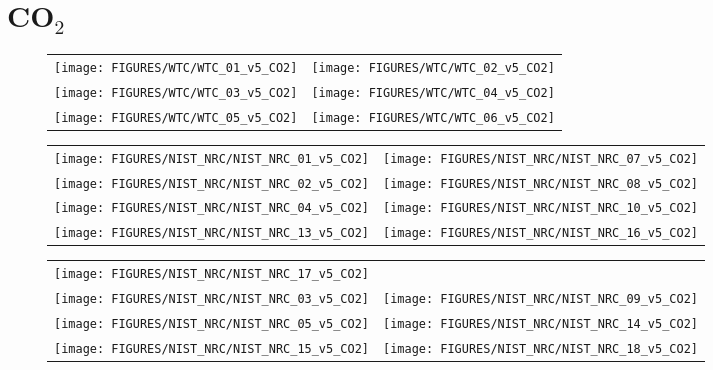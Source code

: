 \clearpage




\section{CO$_2$}

\begin{figure}[h]
\begin{tabular*}{\textwidth}{l@{\extracolsep{\fill}}r}
\texttt{[image: FIGURES/WTC/WTC\_01\_v5\_CO2]} &
\texttt{[image: FIGURES/WTC/WTC\_02\_v5\_CO2]} \\
\texttt{[image: FIGURES/WTC/WTC\_03\_v5\_CO2]} &
\texttt{[image: FIGURES/WTC/WTC\_04\_v5\_CO2]} \\
\texttt{[image: FIGURES/WTC/WTC\_05\_v5\_CO2]} &
\texttt{[image: FIGURES/WTC/WTC\_06\_v5\_CO2]}
\end{tabular*}
\label{NIST_WTC_CO2}
\end{figure}

\begin{figure}[p]
\begin{tabular*}{\textwidth}{l@{\extracolsep{\fill}}r}
\texttt{[image: FIGURES/NIST\_NRC/NIST\_NRC\_01\_v5\_CO2]} &
\texttt{[image: FIGURES/NIST\_NRC/NIST\_NRC\_07\_v5\_CO2]} \\
\texttt{[image: FIGURES/NIST\_NRC/NIST\_NRC\_02\_v5\_CO2]} &
\texttt{[image: FIGURES/NIST\_NRC/NIST\_NRC\_08\_v5\_CO2]} \\
\texttt{[image: FIGURES/NIST\_NRC/NIST\_NRC\_04\_v5\_CO2]} &
\texttt{[image: FIGURES/NIST\_NRC/NIST\_NRC\_10\_v5\_CO2]} \\
\texttt{[image: FIGURES/NIST\_NRC/NIST\_NRC\_13\_v5\_CO2]} &
\texttt{[image: FIGURES/NIST\_NRC/NIST\_NRC\_16\_v5\_CO2]}
\end{tabular*}
\end{figure}

\begin{figure}[p]
\begin{tabular*}{\textwidth}{l@{\extracolsep{\fill}}r}
\texttt{[image: FIGURES/NIST\_NRC/NIST\_NRC\_17\_v5\_CO2]} &
 \\
\texttt{[image: FIGURES/NIST\_NRC/NIST\_NRC\_03\_v5\_CO2]} &
\texttt{[image: FIGURES/NIST\_NRC/NIST\_NRC\_09\_v5\_CO2]} \\
\texttt{[image: FIGURES/NIST\_NRC/NIST\_NRC\_05\_v5\_CO2]} &
\texttt{[image: FIGURES/NIST\_NRC/NIST\_NRC\_14\_v5\_CO2]} \\
\texttt{[image: FIGURES/NIST\_NRC/NIST\_NRC\_15\_v5\_CO2]} &
\texttt{[image: FIGURES/NIST\_NRC/NIST\_NRC\_18\_v5\_CO2]}
\end{tabular*}
\end{figure}

